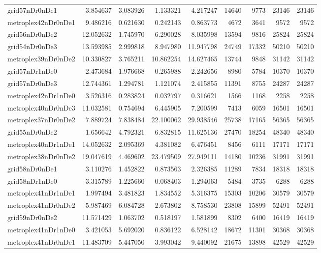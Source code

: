 \begin{longtable}{|l|r|r|r|r|r|r|r|r|}
grid57nDr0nDe1 & 3.854637 & 3.083926 & 1.133321 & 4.217247 & 14640 & 9773 & 23146 & 23146 \\
metroplex42nDr0nDe1 & 9.486216 & 0.621630 & 0.242143 & 0.863773 & 4672 & 3641 & 9572 & 9572 \\
grid56nDr0nDe2 & 12.052632 & 1.745970 & 6.290028 & 8.035998 & 13594 & 9816 & 25824 & 25824 \\
grid54nDr0nDe3 & 13.593985 & 2.999818 & 8.947980 & 11.947798 & 24749 & 17332 & 50210 & 50210 \\
metroplex39nDr0nDe2 & 10.330827 & 3.765211 & 10.862254 & 14.627465 & 13744 & 9848 & 31142 & 31142 \\
grid57nDr1nDe0 & 2.473684 & 1.976668 & 0.265988 & 2.242656 & 8980 & 5784 & 10370 & 10370 \\
grid57nDr0nDe3 & 12.744361 & 1.294781 & 1.121074 & 2.415855 & 11391 & 8755 & 24287 & 24287 \\
metroplex42nDr1nDe0 & 3.526316 & 0.283824 & 0.032797 & 0.316621 & 1566 & 1168 & 2258 & 2258 \\
metroplex40nDr0nDe3 & 11.032581 & 0.754694 & 6.445905 & 7.200599 & 7413 & 6059 & 16501 & 16501 \\
metroplex37nDr0nDe2 & 7.889724 & 7.838484 & 22.100062 & 29.938546 & 25738 & 17165 & 56365 & 56365 \\
grid55nDr0nDe2 & 1.656642 & 4.792321 & 6.832815 & 11.625136 & 27470 & 18254 & 48340 & 48340 \\
metroplex40nDr1nDe1 & 14.052632 & 2.095369 & 4.381082 & 6.476451 & 8456 & 6111 & 17171 & 17171 \\
metroplex38nDr0nDe2 & 19.047619 & 4.469602 & 23.479509 & 27.949111 & 14180 & 10236 & 31991 & 31991 \\
grid58nDr0nDe1 & 3.110276 & 1.452822 & 0.873563 & 2.326385 & 11289 & 7834 & 18318 & 18318 \\
grid58nDr1nDe0 & 3.315789 & 1.225660 & 0.068403 & 1.294063 & 5484 & 3735 & 6288 & 6288 \\
metroplex41nDr1nDe1 & 1.997494 & 3.481823 & 1.834552 & 5.316375 & 15303 & 10206 & 30579 & 30579 \\
metroplex41nDr0nDe2 & 5.987469 & 6.084728 & 2.673802 & 8.758530 & 23808 & 15899 & 52491 & 52491 \\
grid59nDr0nDe2 & 11.571429 & 1.063702 & 0.518197 & 1.581899 & 8302 & 6400 & 16419 & 16419 \\
metroplex41nDr1nDe0 & 3.421053 & 5.692020 & 0.836122 & 6.528142 & 18672 & 11301 & 30368 & 30368 \\
metroplex41nDr0nDe1 & 11.483709 & 5.447050 & 3.993042 & 9.440092 & 21675 & 13898 & 42529 & 42529 \\

\end{longtable}
